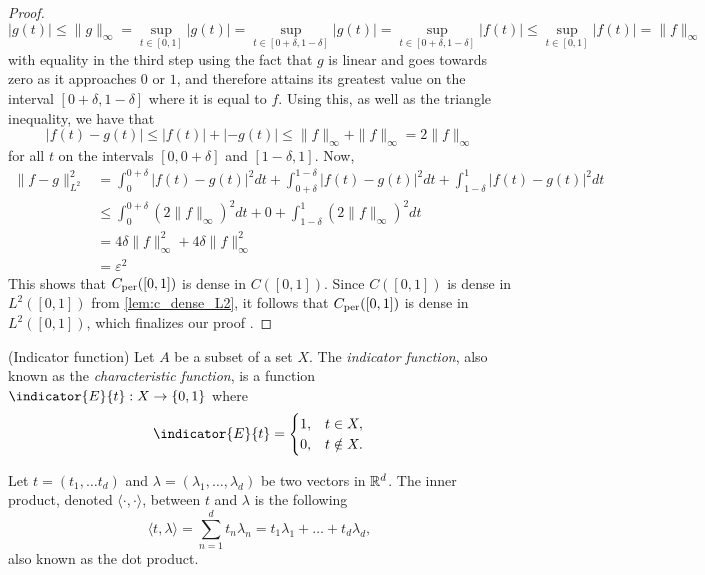 \documentclass[../thesis.tex]{subfiles}
\begin{document}
\begin{proof}
    \begin{equation*}
        |g(t)| \leq \|g\|_{\infty} = \sup_{t\in[0,1]} |g(t)| = \sup_{t\in[0+\delta, 1-\delta]} |g(t)| = \sup_{t\in[0+\delta, 1-\delta]} |f(t)| \leq \sup_{t\in[0, 1]} |f(t)| =\| f\|_{\infty}
    \end{equation*}
    with equality in the third step using the fact that $g$ is linear and goes towards zero as it approaches $0$ or $1$, and therefore attains its greatest value on the interval $[0+\delta,1-\delta]$ where it is equal to $f$. Using this, as well as the triangle inequality, we have that
    \begin{equation*}
        \left|f(t)-g(t) \right| \leq |f(t)| + |-g(t)| \leq \|f \|_{\infty} + \|f \|_{\infty} = 2 \|f \|_{\infty}
    \end{equation*}
    for all $t$ on the intervals $[0, 0+\delta]$ and $[1-\delta,1]$. Now,
    \begin{align*}
        \| f-g \|_{L^2}^2 &=  \int_0^{0+\delta} \left|f(t)-g(t) \right|^2dt + \int_{0+\delta}^{1-\delta} \left|f(t)-g(t) \right|^2dt +\int_{1-\delta}^{1} \left|f(t)-g(t) \right|^2dt\\ 
        &\leq \int_0^{0+\delta} (2 \| f\|_\infty)^2dt + 0 +\int_{1-\delta}^{1} (2 \| f\|_\infty)^2dt\\
        &=  4 \delta \| f\|_\infty^2 + 4 \delta \| f\|_\infty^2\\ 
        &= \varepsilon^2
    \end{align*}
    This shows that $C_{\text{per}}([0,1])$ is dense in $C([0,1])$. Since $C([0,1])$ is dense in $L^2([0,1])$ from \cref{lem:c_dense_L2}, it follows that $C_{\text{per}}([0,1])$ is dense in $L^2([0,1])$, which finalizes our proof \cite[p.~228]{heilMetricsNormsInner2018}.
\end{proof}

\begin{definition}(Indicator function)\label{def:indicator}
    Let $A$ be a subset of a set $X$. The \emph{indicator function}, also known as the \emph{characteristic function}, is a function $\indicator{E}{t}: X \rightarrow \braq{0,1}$ where
    \begin{equation*}
        \indicator{E}{t}  = 
        \begin{cases} 
            1, &  t\in X,\\
            0, &  t \notin X.
        \end{cases}
        \qedhere
    \end{equation*}
\end{definition}


\begin{definition}\label{def:dot_prod}
    Let $t=(t_1,\dots t_d)$ and $\lambda=(\lambda_1, \dots, \lambda_d)$ be two vectors in $\mathbb{R}^d$. The inner product, denoted $\langle \cdot, \cdot \rangle$, between $t$ and $\lambda$ is the following 
    \begin{equation*}
        \langle t, \lambda \rangle = \sum_{n=1}^d t_n \lambda_n = t_1\lambda_1 + \dots + t_d\lambda_d,
    \end{equation*}
    also known as the dot product. 
\end{definition}
\end{document}
